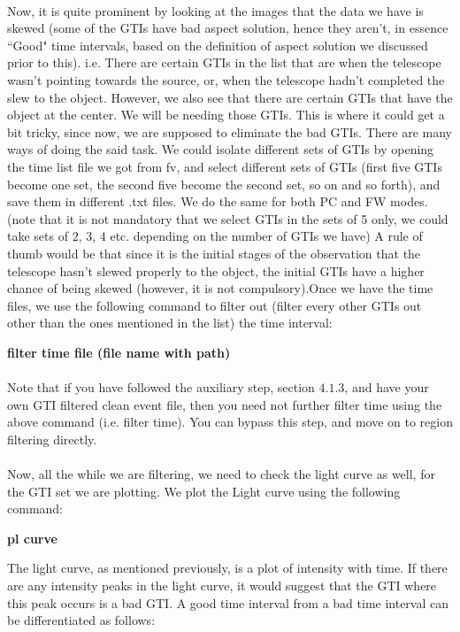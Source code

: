 \documentclass[a4paper,twoside]{report}
\numberwithin{equation}{section}
\begin{document}
\paragraph{}
Now, it is quite prominent by looking at the images that the data we have is skewed (some of the GTIs have bad aspect solution, hence they aren't, in essence ``Good" time intervals, based on the definition of aspect solution we discussed prior to this). i.e. There are certain GTIs in the list that are when the telescope wasn’t pointing towards the source, or, when the telescope hadn’t completed the slew to the object. However, we also see that there are certain GTIs that have the object at the center. We will be needing those GTIs. This is where it could get a bit tricky, since now, we are supposed to eliminate the bad GTIs. There are many ways of doing the said task. We could isolate different sets of GTIs by opening the time list file we got from fv, and select different sets of GTIs (first five GTIs become one set, the second five become the second set, so on and so forth), and save them in different .txt files. We do the same for both PC and FW modes. (note that it is not mandatory that we select GTIs in the sets of 5 only, we could take sets of $2$, $3$, $4$ etc. depending on the number of GTIs we have) A rule of thumb would be that since it is the initial stages of the observation that the telescope hasn’t slewed properly to the object, the initial GTIs have a higher chance of being skewed (however, it is not compulsory).Once we have the time files, we use the following command to filter out (filter every other GTIs out other than the ones mentioned in the list) the time interval:
\begin{center}
\item \large \textbf{filter time file (file name with path)}
\end{center}
\paragraph{}
Note that if you have followed the auxiliary step, section $4.1.3$, and have your own GTI filtered clean event file, then you need not further filter time using the above command (i.e. filter time). You can bypass this step, and move on to region filtering directly. 
\paragraph{}
Now, all the while we are filtering, we need to check the light curve as well, for the GTI set we are plotting. We plot the Light curve using the following command: 
\begin{center}
\item \large \textbf{pl curve}
\end{center}
The light curve, as mentioned previously, is a plot of intensity with time. If there are any intensity peaks in the light curve, it would suggest that the GTI where this peak occurs is a bad GTI. A good time interval from a bad time interval can be differentiated as follows: 
\end{document}
